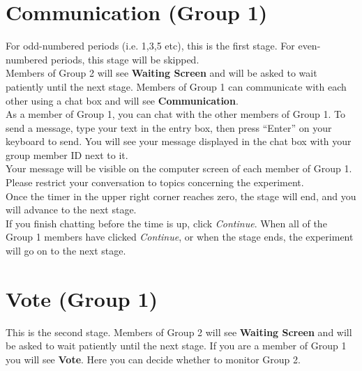 \documentclass[12pt]{article}
\begin{document}
\section{Communication (Group 1)}


For odd-numbered periods (i.e. 1,3,5 etc), this is the first stage. For even-numbered periods, this stage will be skipped.\\ 

Members of Group 2 will see {\bf Waiting Screen} and will be asked to wait patiently until the next stage. Members of Group 1 can communicate with each other using a chat box and will see {\bf Communication}.\\  

As a member of Group 1, you can chat with the other members of Group 1.  To send a message, type your text in the entry box, then press ``Enter'' on your keyboard to send.  You will see your message displayed in the chat box with your group member ID next to it.\\ 

Your message will be visible on the computer screen of each member of Group 1. Please restrict your conversation to topics concerning the experiment.\\  

Once the timer in the upper right corner reaches zero, the stage will end, and you will advance to the next stage.\\

If you finish chatting before the time is up, click {\em Continue}. When all of the Group 1 members have clicked {\em Continue}, or when the stage ends, the experiment will go on to the next stage.\\  


\iffalse
\section{Vote (Group 1)}

This is the second stage. Members of Group 2 will see {\bf Waiting Screen} and will be asked to wait patiently until the next stage. If you are a member of Group 1 you will see {\bf Vote}. Here you can decide whether to monitor Group 2.\\ 
\end{document}

